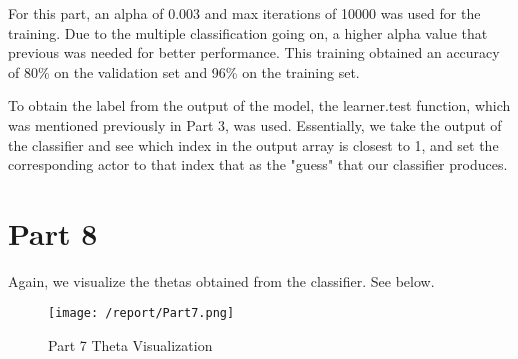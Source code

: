 \documentclass[11pt,a4paper]{report}
\begin{document}
For this part, an alpha of 0.003 and max iterations of 10000 was used for the training. Due to the multiple classification going on, a higher alpha value that previous was needed for better performance. This training obtained an accuracy of 80\% on the validation set and 96\% on the training set.

To obtain the label from the output of the model, the learner.test function, which was mentioned previously in Part 3, was used. Essentially, we take the output of the classifier and see which index in the output array is closest to 1, and set the corresponding actor to that index that as the "guess" that our classifier produces.

\newpage
\section*{Part 8}
Again, we visualize the thetas obtained from the classifier. See below.
\begin{figure}[h]
\centering
\texttt{[image: /report/Part7.png]}
\caption{Part 7 Theta Visualization}
\end{figure}
\end{document}
